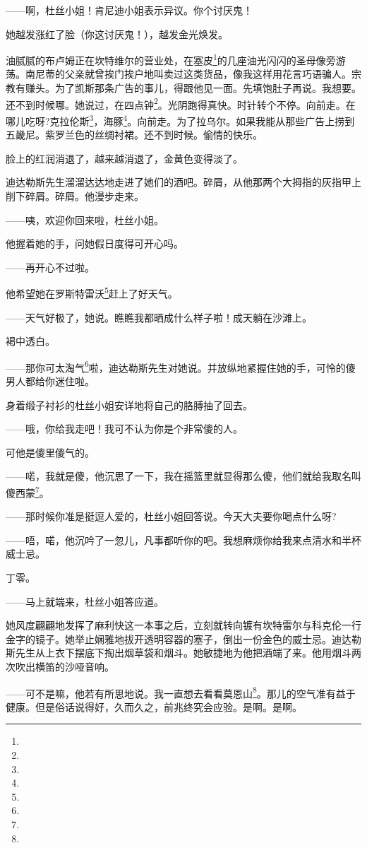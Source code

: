 \par ——啊，杜丝小姐！肯尼迪小姐表示异议。你个讨厌鬼！
\par 她越发涨红了脸（你这讨厌鬼！），越发金光焕发。
\par 油腻腻的布卢姆正在坎特维尔的营业处，在塞皮\footnote{}的几座油光闪闪的圣母像旁游荡。南尼蒂的父亲就曾挨门挨户地叫卖过这类货品，像我这样用花言巧语骗人。宗教有赚头。为了凯斯那条广告的事儿，得跟他见一面。先填饱肚子再说。我想要。还不到时候哪。她说过，在四点钟\footnote{}。光阴跑得真快。时针转个不停。向前走。在哪儿吃呀?克拉伦斯\footnote{}，海豚\footnote{}。向前走。为了拉乌尔。如果我能从那些广告上捞到五畿尼。紫罗兰色的丝绸衬裙。还不到时候。偷情的快乐。
\par 脸上的红润消退了，越来越消退了，金黄色变得淡了。
\par 迪达勒斯先生溜溜达达地走进了她们的酒吧。碎屑，从他那两个大拇指的灰指甲上削下碎屑。碎屑。他漫步走来。
\par ——咦，欢迎你回来啦，杜丝小姐。
\par 他握着她的手，问她假日度得可开心吗。
\par ——再开心不过啦。
\par 他希望她在罗斯特雷沃\footnote{}赶上了好天气。
\par ——天气好极了，她说。瞧瞧我都晒成什么样子啦！成天躺在沙滩上。
\par 褐中透白。
\par ——那你可太淘气\footnote{}啦，迪达勒斯先生对她说。并放纵地紧握住她的手，可怜的傻男人都给你迷住啦。
\par 身着缎子衬衫的杜丝小姐安详地将自己的胳膊抽了回去。
\par ——哦，你给我走吧！我可不认为你是个非常傻的人。
\par 可他是傻里傻气的。
\par ——喏，我就是傻，他沉思了一下，我在摇篮里就显得那么傻，他们就给我取名叫傻西蒙\footnote{}。
\par ——那时候你准是挺逗人爱的，杜丝小姐回答说。今天大夫要你喝点什么呀?
\par ——唔，喏，他沉吟了一忽儿，凡事都听你的吧。我想麻烦你给我来点清水和半杯威士忌。
\par 丁零。
\par ——马上就端来，杜丝小姐答应道。
\par 她风度翩翩地发挥了麻利快这一本事之后，立刻就转向镀有坎特雷尔与科克伦一行金字的镜子。她举止娴雅地拔开透明容器的塞子，倒出一份金色的威士忌。迪达勒斯先生从上衣下摆底下掏出烟草袋和烟斗。她敏捷地为他把酒端了来。他用烟斗两次吹出横笛的沙哑音响。
\par ——可不是嘛，他若有所思地说。我一直想去看看莫恩山\footnote{}。那儿的空气准有益于健康。但是俗话说得好，久而久之，前兆终究会应验。是啊。是啊。
